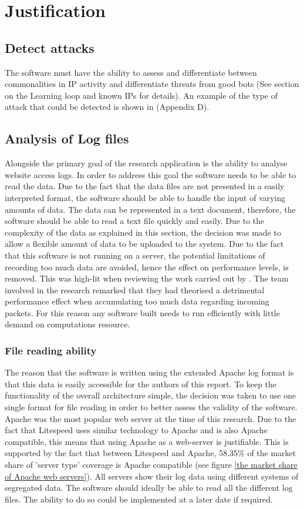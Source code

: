 \section{Justification}

\subsection*{Detect attacks} 

The software must have the ability to assess and differentiate between commonalities in IP activity and differentiate threats from good bots (See section on the Learning loop and known IPs for details). An example of the type of attack that could be detected is shown in (Appendix D).

\subsection*{Analysis of Log files}
Alongside the primary goal of the research application is the ability to analyse website access logs. In order to address this goal the software needs to be able to read the data. Due to the fact that the data files are not presented in a easily interpreted format, the software should be able to handle the input of varying amounts of data. The data can be represented in a text document, therefore, the software should be able to read a text file quickly and easily. Due to the complexity of the data as explained in this section, the decision was made to allow a flexible amount of data to be uploaded to the system. Due to the fact that this software is not running on a server, the potential limitations of recording too much data are avoided, hence the effect on performance levels, is removed. This was high-lit when reviewing the work carried out by \cite{staniford2002practical}. The team involved in the research remarked that they had theorised a detrimental performance effect when accumulating too much data regarding incoming packets. For this reason any software built needs to run efficiently with little demand on computations resource.

\subsubsection*{File reading ability}
The reason that the software is written using the extended Apache log format is that this data is easily accessible for the authors of this report. To keep the functionality of the overall architecture simple, the decision was taken to use one single format for file reading in order to better assess the validity of the software. Apache was the most popular web server at the time of this research. Due to the fact that Litespeed uses similar technology to Apache and is also Apache compatible, this means that using Apache as a web-server is justifiable. This is supported by the fact that between Litespeed and Apache, 58.35\% of the market share of 'server type' coverage is Apache compatible (see figure \ref{the market share of Apache web servers}). All servers show their log data using different systems of segregated data. The software should ideally be able to read all the different log files. The ability to do so could be implemented at a later date if required. 

